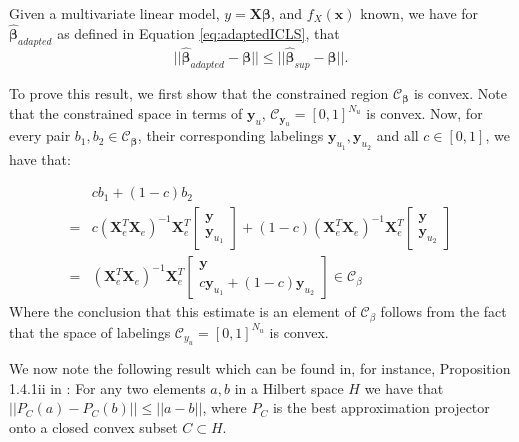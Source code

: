 \documentclass[smallcondensed]{svjour3}
\newcommand{\Xe}{\mathbf{X}_e  }
\newcommand{\XeT}{\mathbf{X}_e^T}
\begin{document}
\begin{theorem}
Given a multivariate linear model, $y = \boldsymbol{X} \boldsymbol{{\beta}}$, and $f_X(\boldsymbol{x})$ known, we have for $\boldsymbol{\hat{\beta}}_{adapted}$ as defined in Equation \eqref{eq:adaptedICLS}, that  
\begin{equation}
||\boldsymbol{\hat{\beta}}_{adapted}-\boldsymbol{{\beta}}|| \leq ||\boldsymbol{\hat{\beta}}_{sup}-\boldsymbol{{\beta}}||.
\end{equation}
\end{theorem}

To prove this result, we first show that the constrained region $\mathcal{C}_{\boldsymbol{\beta}}$ is convex. Note that the constrained space in terms of $\mathbf{y}_u$, $\mathcal{C}_{\mathbf{y}_u}=[0,1]^{N_u}$ is convex. Now, for every pair $b_1, b_2 \in \mathcal{C}_{\boldsymbol{\beta}}$, their corresponding labelings $\mathbf{y}_{u_1}, \mathbf{y}_{u_2}$ and all $c \in [0,1]$, we have that: 

\begin{equation}
\begin{aligned}
&c b_1 + (1-c) b_2 \\
=&c \left( {\XeT} {\Xe} \right)^{-1} {\XeT} \begin{bmatrix} \mathbf{y}  \\ \mathbf{y}_{u_1} \end{bmatrix} + (1-c) \left( {\XeT} {\Xe} \right)^{-1} {\XeT} \begin{bmatrix} \mathbf{y}  \\ \mathbf{y}_{u_2} \end{bmatrix} \\
=&\left( {\XeT} {\Xe} \right)^{-1} {\XeT} \begin{bmatrix} \mathbf{y}  \\ c \mathbf{y}_{u_1} + (1-c) \mathbf{y}_{u_2}  \end{bmatrix} \in \mathcal{C}_{\beta}
\end{aligned}
\end{equation}
Where the conclusion that this estimate is an element of $\mathcal{C}_{\beta}$ follows from the fact that the space of labelings $\mathcal{C}_{y_u}=[0,1]^{N_u}$ is convex. 

We now note the following result which can be found in, for instance, Proposition 1.4.1ii in \cite[p.17]{Aubin2000}: For any two elements $a,b$ in a Hilbert space $H$ we have that $||P_C(a)-P_C(b)|| \leq ||a-b||$, where $P_C$ is the best approximation projector onto a closed convex subset $C \subset H$.
\end{document}
